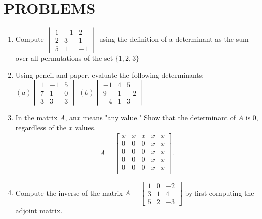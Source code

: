 \documentclass[../main.tex]{subfiles}
\begin{document}
\section{PROBLEMS}

\begin{enumerate}[label=\textbf{\thechapter.\arabic{*}}]
  \item \label{pr:4_1} Compute \(\begin{vmatrix}
    1 & -1 & 2\\
    2 & 3 & 1\\
    5 & 1 & -1
  \end{vmatrix}\)
  using the definition of a determinant as the sum over all permutations of the set \(\{1, 2, 3\}\)
  
  \item \label{pr:4_2} Using pencil and paper, evaluate the following determinants:\\
  \((a)\begin{vmatrix}
    1 & -1 & 5\\
    7 & 1 & 0\\
    3 & 3 & 3
  \end{vmatrix}\)
  \((b)\begin{vmatrix}
    -1 & 4 & 5\\
    9 & 1 & -2\\
    -4 & 1 & 3
  \end{vmatrix}\)
  
  \item \label{pr:4_3} In the matrix \(A\), an\(x\) means "any value." Show that the determinant of \(A\) is 0, regardless of the \(x\) values.
  \begin{equation*}
    A =\begin{bmatrix}
      x & x & x & x & x\\
      0 & 0 & 0 & x & x\\
      0 & 0 & 0 & x & x\\
      0 & 0 & 0 & x & x\\
      0 & 0 & 0 & x & x\\
    \end{bmatrix}.
  \end{equation*}
  
  \item \label{pr:4_4} Compute the inverse of the matrix \(A = \begin{bmatrix}
    1 & 0 & -2\\
    3 & 1 & 4\\
    5 & 2 & -3
  \end{bmatrix}\)
  by first computing the adjoint matrix.
  

\end{enumerate}
\end{document}
